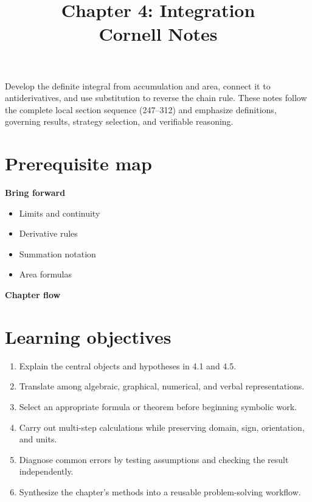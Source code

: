 \documentclass[11pt]{article}
\title{Chapter 4: Integration\\[2mm]\large Cornell Notes}
\author{}
\date{}
\begin{document}
\maketitle
\thispagestyle{fancy}
\begin{orientationbox}
Develop the definite integral from accumulation and area, connect it to antiderivatives, and use substitution to reverse the chain rule. These notes follow the complete local section sequence (247--312) and emphasize definitions, governing results, strategy selection, and verifiable reasoning.
\end{orientationbox}

\section{Prerequisite map}
\begin{minipage}[t]{0.42\textwidth}
\textbf{Bring forward}
\begin{itemize}
\item Limits and continuity
\item Derivative rules
\item Summation notation
\item Area formulas
\end{itemize}
\end{minipage}\hfill
\begin{minipage}[t]{0.54\textwidth}
\textbf{Chapter flow}
\begin{center}
\end{center}
\end{minipage}

\section{Learning objectives}
\begin{enumerate}
\item Explain the central objects and hypotheses in 4.1 and 4.5.
\item Translate among algebraic, graphical, numerical, and verbal representations.
\item Select an appropriate formula or theorem before beginning symbolic work.
\item Carry out multi-step calculations while preserving domain, sign, orientation, and units.
\item Diagnose common errors by testing assumptions and checking the result independently.
\item Synthesize the chapter's methods into a reusable problem-solving workflow.
\end{enumerate}
\end{document}
